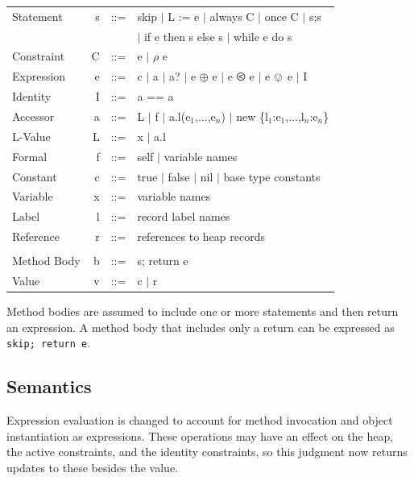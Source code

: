 \documentclass{article}
\newcommand{\judgment}[1]{\begin{flushleft} \fbox{#1}\end{flushleft}}
\newcommand{\evalBig}[5]{{\tt <#1|#2|C|I|#3>} $\Downarrow$ {\tt <#4|C|I|#5>}}
\begin{document}
\begin{tt}
\begin{tabular}{lrrl}
{\rm Statement} & s & ::= & skip $\mid$ L := e $\mid$ always C $\mid$ once C $\mid$ s;s \\
  & & & $\mid$ if e then s else s $\mid$ while e do s \\
{\rm Constraint} & C & ::= & e $\mid$ $\rho$ e \\
{\rm Expression} & e & ::= & c $\mid$ a $\mid$ a? $\mid$ e $\oplus$ e  $\mid$ e $\olessthan$ e $\mid$ e $\ovee$ e $\mid$ I \\
{\rm Identity} & I & ::= & a == a\\
{\rm Accessor} & a & ::= & L $\mid$ f $\mid$ a.l(e$_1$,$\ldots$,e$_n$) $\mid$ new \{l$_1$:e$_1$,$\ldots$,l$_n$:e$_n$\} \\
{\rm L-Value} & L & ::= & x $\mid$ a.l \\
{\rm Formal} & f & ::= & self $\mid$ {\rm variable names} \\
{\rm Constant} & c & ::= & true $\mid$ false $\mid$ nil $\mid$ {\rm base type constants}\\
{\rm Variable} & x & ::= & {\rm variable names} \\
{\rm Label} & l & ::= & {\rm record label names} \\
{\rm Reference} & r & ::= & {\rm references to heap records} \\\\
{\rm Method Body} & b & ::= & s; return e\\

{\rm Value} & v & ::= & c $\mid$ r\\
\end{tabular}
\end{tt}

Method bodies are assumed to include one or more statements and then
return an expression. A method body that includes only a return can be
expressed as {\tt skip; return e}.

\subsection{Semantics}

\judgment{\evalBig{E}{H}{e}{H}{v}}

Expression evaluation is changed to account for method invocation and
object instantiation as expressions. These operations may have an
effect on the heap, the active constraints, and the identity
constraints, so this judgment now returns updates to these besides the
value.
\end{document}
